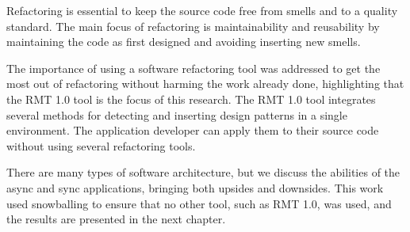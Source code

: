 Refactoring is essential to keep the source code free from smells and to a quality standard. The main focus of refactoring is maintainability and reusability by maintaining the code as first designed and avoiding inserting new smells.

The importance of using a software refactoring tool was addressed to get the most out of refactoring without harming the work already done, highlighting that the RMT 1.0 tool is the focus of this research.
The RMT 1.0 tool integrates several methods for detecting and inserting design patterns in a single environment. The application developer can apply them to their source code without using several refactoring tools.

There are many types of software architecture, but we discuss the abilities of the async and sync applications, bringing both upsides and downsides. This work used snowballing to ensure that no other tool, such as RMT 1.0, was used, and the results are presented in the next chapter.